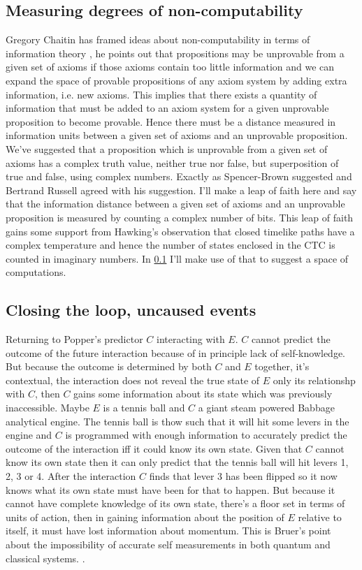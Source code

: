 \documentclass{article}
\begin{document}
\subsection{Measuring degrees of non-computability}
\label{sec:measuring-non-computability}
Gregory Chaitin has framed ideas about non-computability in terms of information theory \autocite{Chaitin1987AlgorithmicTheory}, he points out that propositions may be unprovable from a given set of axioms if those axioms contain too little information and we can expand the space of provable propositions of any axiom system by adding extra information, i.e. new axioms. This implies that there exists a quantity of information that must be added to an axiom system for a given unprovable proposition to become provable. Hence there must be a distance measured in information units between a given set of axioms and an unprovable proposition. We've suggested that a proposition which is unprovable from a given set of axioms has a complex truth value, neither true nor false, but superposition of true and false, using complex numbers. Exactly as Spencer-Brown suggested and Bertrand Russell agreed with his suggestion. I'll make a leap of faith here and say that the information distance between a given set of axioms and an unprovable proposition is measured by counting a complex number of bits. This leap of faith gains some support from Hawking's observation that closed timelike paths have a complex temperature \autocite{Hawking1995QuantumCurves} and hence the number of states enclosed in the CTC is counted in imaginary numbers. In \ref{sec:measuring-non-computability} I'll make use of that to suggest a space of computations. 

\subsection{Closing the loop, uncaused events}
Returning to Popper's predictor $C$ interacting with $E$. $C$ cannot predict the outcome of the future interaction because of in principle lack of self-knowledge. But because the outcome is determined by both $C$ and $E$ together, it's contextual, the interaction does not reveal the true state of $E$ only its relationshp with $C$, then $C$ gains some information about its state which was previously inaccessible. Maybe $E$ is a tennis ball and $C$ a giant steam powered Babbage analytical engine. The tennis ball is thow such that it will hit some levers in the engine and $C$ is programmed with enough information to accurately predict the outcome of the interaction iff it could know its own state. Given that $C$ cannot know its own state then it can only predict that the tennis ball will hit levers 1, 2, 3 or 4. After the interaction $C$ finds that lever 3 has been flipped so it now knows what its own state must have been for that to happen. But because it cannot have complete knowledge of its own state, there's a floor set in terms of units of action, then in gaining information about the position of $E$ relative to itself, it must have lost information about momentum. This is Bruer's point about the impossibility of accurate self measurements in both quantum and classical systems.  \autocite{Breuer1995}. 
\end{document}
